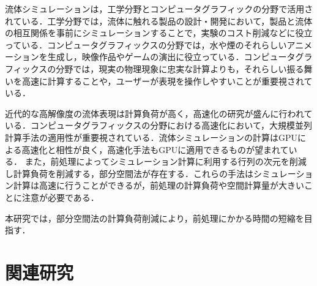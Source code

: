 \documentclass[a4j,12pt]{jreport}
\begin{document}
流体シミュレーションは，工学分野とコンピュータグラフィックの分野で活用されている．工学分野では，流体に触れる製品の設計・開発において，製品と流体の相互関係を事前にシミュレーションすることで，実験のコスト削減などに役立っている．コンピュータグラフィックスの分野では，水や煙のそれらしいアニメーションを生成し，映像作品やゲームの演出に役立っている．コンピュータグラフィックスの分野では，現実の物理現象に忠実な計算よりも，それらしい振る舞いを高速に計算することや，ユーザーが表現を操作しやすいことが重要視されている．

近代的な高解像度の流体表現は計算負荷が高く，高速化の研究が盛んに行われている．コンピュータグラフィックスの分野における高速化において，大規模並列計算手法の適用性が重要視されている．流体シミュレーションの計算はGPUによる高速化と相性が良く，高速化手法もGPUに適用できるものが望まれている．
また，前処理によってシミュレーション計算に利用する行列の次元を削減し計算負荷を削減する，部分空間法が存在する．これらの手法はシミュレーション計算は高速に行うことができるが，前処理の計算負荷や空間計算量が大きいことに注意が必要である．

本研究では，部分空間法の計算負荷削減により，前処理にかかる時間の短縮を目指す．
\chapter{関連研究} \label{chapter:2}
\end{document}
